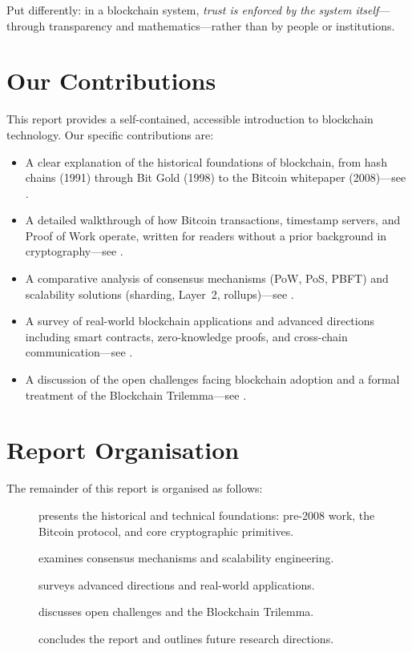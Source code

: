 Put differently: in a blockchain system, \emph{trust is enforced by the system itself}---through transparency and mathematics---rather than by people or institutions.

\section{Our Contributions}

This report provides a self-contained, accessible introduction to blockchain technology. Our specific contributions are:

\begin{itemize}
    \item A clear explanation of the historical foundations of blockchain, from hash chains (1991) through Bit Gold (1998) to the Bitcoin whitepaper (2008)---see .
    \item A detailed walkthrough of how Bitcoin transactions, timestamp servers, and Proof of Work operate, written for readers without a prior background in cryptography---see .
    \item A comparative analysis of consensus mechanisms (PoW, PoS, PBFT) and scalability solutions (sharding, Layer~2, rollups)---see .
    \item A survey of real-world blockchain applications and advanced directions including smart contracts, zero-knowledge proofs, and cross-chain communication---see .
    \item A discussion of the open challenges facing blockchain adoption and a formal treatment of the Blockchain Trilemma---see .
\end{itemize}

\section{Report Organisation}

The remainder of this report is organised as follows:
\begin{description}
    \item[] presents the historical and technical foundations: pre-2008 work, the Bitcoin protocol, and core cryptographic primitives.
    \item[] examines consensus mechanisms and scalability engineering.
    \item[] surveys advanced directions and real-world applications.
    \item[] discusses open challenges and the Blockchain Trilemma.
    \item[] concludes the report and outlines future research directions.
\end{description}

